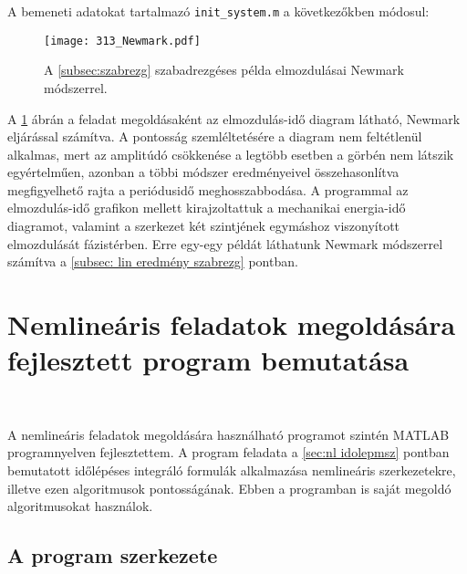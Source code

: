 A bemeneti adatokat tartalmazó \verb|init_system.m| a következőkben módosul:

 

\begin{figure}[h]
\centering
\texttt{[image: 313\_Newmark.pdf]}
\caption{A \ref{subsec:szabrezg} szabadrezgéses példa elmozdulásai Newmark módszerrel.}
\label{fig:szabrezg_er_newmark}
\end{figure}

A \ref{fig:szabrezg_er_newmark} ábrán a feladat megoldásaként az elmozdulás-idő diagram látható, Newmark eljárással számítva. 
A pontosság szemléltetésére  a diagram nem feltétlenül alkalmas, mert az amplitúdó csökkenése a legtöbb esetben a görbén nem látszik egyértelműen, azonban a többi módszer eredményeivel összehasonlítva megfigyelhető rajta a periódusidő meghosszabbodása.  A programmal az elmozdulás-idő grafikon mellett kirajzoltattuk a mechanikai energia-idő diagramot, valamint a szerkezet két szintjének egymáshoz viszonyított  elmozdulását fázistérben. Erre egy-egy  példát  láthatunk Newmark módszerrel számítva a \ref{subsec: lin eredmény szabrezg} pontban.

 

\section{Nemlineáris feladatok megoldására fejlesztett program bemutatása}\label{sec: nemlin progi}

{\ }

A nemlineáris feladatok megoldására használható  programot szintén MATLAB programnyelven fejlesztettem. A program feladata  a \ref{sec:nl idolepmsz} pontban bemutatott időlépéses integráló formulák alkalmazása nemlineáris szerkezetekre, illetve ezen algoritmusok pontosságának. Ebben a programban is saját megoldó algoritmusokat használok.


\subsection{A program szerkezete}\label{subsec: nemlin prog szerk}
 
{\ }

